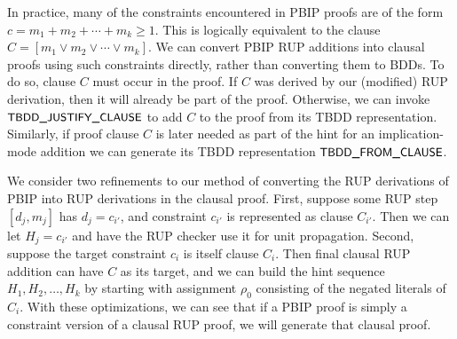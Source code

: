 \documentclass{easychair}
\newcommand{\mlit}{m}
\newcommand{\assign}{\rho}
\newcommand{\fname}[1]{\mbox{\small\sf #1}}
\begin{document}
In practice, many of the constraints encountered in PBIP proofs are of
the form $c = \mlit_1 + \mlit_2 + \cdots + \mlit_k \geq 1$.  This is logically
equivalent to the clause $C = [\mlit_1 \lor \mlit_2 \lor \cdots \lor  \mlit_k]$.
We can convert PBIP RUP additions into clausal proofs
using such constraints directly, rather than converting
them to BDDs.
To do so, clause $C$ must occur in the proof.  If $C$ was derived by our (modified) RUP
derivation, then it will already be part of the proof.  Otherwise, we can invoke
$\fname{TBDD\_JUSTIFY\_CLAUSE}$ to add $C$ to the proof from its TBDD representation.
Similarly, if proof clause $C$ is later needed as part of the hint for an implication-mode addition
we can generate its TBDD representation
$\fname{TBDD\_FROM\_CLAUSE}$.

We consider two refinements to our method of converting the RUP
derivations of PBIP into RUP derivations in the clausal proof.  First,
suppose some RUP step $[d_j, \mlit_j]$ has $d_j = c_{i'}$, and constraint $c_{i'}$ is
represented as clause $C_{i'}$.  Then we can let $H_j = c_{i'}$
and have the RUP checker use it for
unit propagation.  Second, suppose the target constraint $c_i$ is
itself clause $C_i$.  Then final clausal RUP addition can have $C$ as its target,
and we can build the hint sequence $H_1, H_2, \ldots, H_k$
by starting with
assignment $\assign_0$ consisting of the negated literals of $C_i$.
With these optimizations, we can see that if a PBIP proof is simply a constraint
version of a clausal RUP proof, we will generate that clausal proof.


\end{document}
